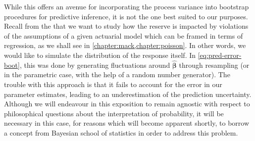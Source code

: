 \documentclass[a4paper]{book}
\begin{document}
While this offers an avenue for incorporating the process variance into bootstrap procedures for predictive inference, it is not the one best suited to our purposes. Recall from the  that we want to study how the reserve is impacted by violations of the assumptions of a given actuarial model which can be framed in terms of regression, as we shall see in \cref{chapter:mack,chapter:poisson}. In other words, we would like to simulate the distribution of the response itself. In \cref{eq:pred-error-boot}, this was done by generating fluctuations around $\widehat{\bm{\beta}}$ through resampling (or in the parametric case, with the help of a random number generator). The trouble with this approach is that it fails to account for the error in our parameter estimates, leading to an underestimation of the prediction uncertainty. Although we will endeavour in this exposition to remain agnostic with respect to philosophical questions about the interpretation of probability, it will be necessary in this case, for reasons which will become apparent shortly, to borrow a concept from Bayesian school of statistics in order to address this problem.
\end{document}

